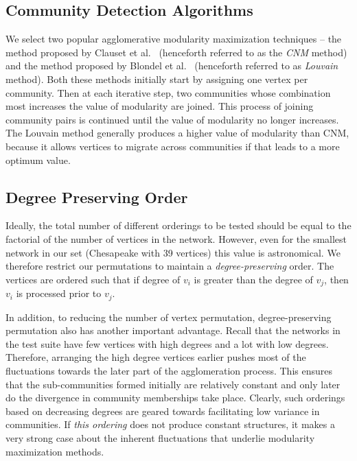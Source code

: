 

\subsection{Community Detection Algorithms}
We select two popular agglomerative modularity maximization techniques -- the method proposed by Clauset et al.~\cite{cnm2004}
(henceforth referred to as the {\em CNM} method) and the method proposed by Blondel et al.~\cite{bgll2008} (henceforth referred to as
{\em Louvain}
method). Both these methods initially start by assigning one vertex per community. Then at each iterative step, two communities whose
combination most increases the value of modularity are joined. This process of joining community pairs is continued until the value of
modularity no longer increases. The Louvain method generally produces a higher value of modularity than CNM, because it allows vertices to
migrate across communities if that leads to a more optimum value.



\subsection{Degree Preserving Order}\label{order} 
Ideally, the total number of different orderings to be tested should be equal to the factorial of the
number
of vertices in the network. However, even for the smallest network in our set (Chesapeake with 39 vertices) this value is astronomical. We
therefore restrict our permutations to maintain a {\it degree-preserving} order. The vertices are ordered such that if degree of $v_i$ is
greater than the degree of $v_j$, then $v_i$ is processed prior to $v_j$.

In addition, to reducing the number of vertex permutation, degree-preserving permutation also has another important advantage. Recall
that
the networks in the test suite have few vertices with high degrees and a lot with low degrees. Therefore, arranging the high degree vertices
earlier pushes most of the fluctuations towards the later part of the agglomeration process. This ensures
that the sub-communities formed initially are relatively constant and only later do the divergence in community memberships take place.
Clearly, such orderings based on decreasing degrees are geared towards facilitating low variance in communities. If {\it this ordering}
does not produce constant structures, it makes a very strong case about the inherent fluctuations that underlie modularity
maximization methods.



